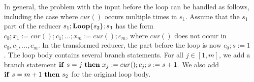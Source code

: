 \documentclass{llncs}
\newcommand{\cur}{cur()}
\newcommand{\IF}[2]{
	\ifmmode
	\mathbf{if}\ #1 \ \mathbf{then}\ #2
	\else
	\textbf{if}\ #1 \ \textbf{then}\ #2
	\fi}
\newcommand{\rloop}{
	\ifmmode
	\mathbf{Loop}
	\else
	\textbf{Loop}
	\fi}
\begin{document}
%			

In general, the problem with the input before the loop can be handled as follows,
including the case where $\cur$ occurs multiple times in $s_1$. Assume that the
$s_1$ part of the reducer $s_1;\rloop\{s_2\};s_3$ has the form
$c_0;x_{1}{:=} \cur;c_1; \ldots; x_{m}{:=}\cur;c_m$, where $\cur$ does
not occur in $c_0,c_1,\ldots, c_m$. 
In the transformed reducer, the part before the loop is now $c_0;s:=1$. The loop body contains several branch statements. 
For all $j \in [1,m]$, we add a branch statement $\IF{s=j}{x_{j}:=\cur; c_j; s:=s+1}$. 
We also add $\IF{s=m+1}{s_2}$ for the original loop body.


\end{document}
